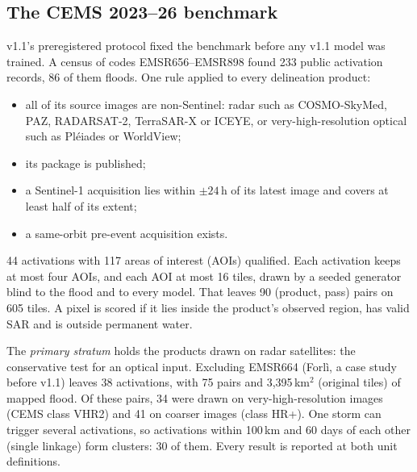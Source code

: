 \documentclass[10pt,twocolumn,a4paper]{article}
\begin{document}
\subsection{The CEMS 2023--26 benchmark}\label{sec:benchmark}
v1.1's preregistered protocol fixed the benchmark before any v1.1 model was trained.
A census of codes EMSR656--EMSR898 found 233 public activation records, 86 of them floods. One rule applied to every
delineation product:
\begin{itemize}
  \item all of its source images are non-Sentinel: radar such as COSMO-SkyMed, PAZ, RADARSAT-2, TerraSAR-X or ICEYE,
    or very-high-resolution optical such as Pl\'eiades or WorldView;
  \item its package is published;
  \item a Sentinel-1 acquisition lies within $\pm24$\,h of its latest image and covers at least half of its extent;
  \item a same-orbit pre-event acquisition exists.
\end{itemize}
44 activations with 117 areas of interest (AOIs) qualified. Each activation keeps at most four AOIs, and each AOI at
most 16 tiles, drawn by a seeded generator blind to the flood and to every model. That leaves 90 (product, pass)
pairs on 605 tiles. A pixel is scored if it lies inside the product's observed region, has valid SAR and is outside
permanent water.

The \emph{primary stratum} holds the products drawn on radar satellites: the conservative test for an optical input.
Excluding EMSR664 (Forl\`i, a case study before v1.1) leaves 38 activations, with 75 pairs and 3,395\,km$^2$ (original tiles) of
mapped flood. Of these pairs, 34 were drawn on very-high-resolution images (CEMS class VHR2) and 41 on coarser
images (class HR+). One storm can trigger several activations, so activations within 100\,km and 60 days of each
other (single linkage) form clusters: 30 of them. Every result is reported at both unit definitions.
\end{document}
